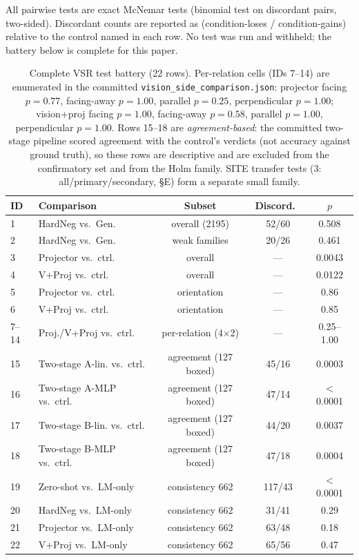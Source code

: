 All pairwise tests are exact McNemar tests (binomial test on discordant pairs,
two-sided). Discordant counts are reported as (condition-loses /
condition-gains) relative to the control named in each row. No test was run and
withheld; the battery below is complete for this paper.

\begin{table}[h]
\centering
\footnotesize
\setlength{\tabcolsep}{6pt}
\begin{tabular}{llccc}
\toprule
ID & Comparison & Subset & Discord.\ & $p$ \\
\midrule
1 & HardNeg vs.\ Gen. & overall (2195) & 52/60 & 0.508 \\
2 & HardNeg vs.\ Gen. & weak families & 20/26 & 0.461 \\
3 & Projector vs.\ ctrl. & overall & --- & 0.0043 \\
4 & V+Proj vs.\ ctrl. & overall & --- & 0.0122 \\
5 & Projector vs.\ ctrl. & orientation & --- & 0.86 \\
6 & V+Proj vs.\ ctrl. & orientation & --- & 0.85 \\
7--14 & Proj./V+Proj vs.\ ctrl. & per-relation (4$\times$2) & --- & 0.25--1.00 \\
15 & Two-stage A-lin. vs.\ ctrl. & agreement (127 boxed) & 45/16 & 0.0003 \\
16 & Two-stage A-MLP vs.\ ctrl. & agreement (127 boxed) & 47/14 & $<$0.0001 \\
17 & Two-stage B-lin. vs.\ ctrl. & agreement (127 boxed) & 44/20 & 0.0037 \\
18 & Two-stage B-MLP vs.\ ctrl. & agreement (127 boxed) & 47/18 & 0.0004 \\
19 & Zero-shot vs.\ LM-only & consistency 662 & 117/43 & $<$0.0001 \\
20 & HardNeg vs.\ LM-only & consistency 662 & 31/41 & 0.29 \\
21 & Projector vs.\ LM-only & consistency 662 & 63/48 & 0.18 \\
22 & V+Proj vs.\ LM-only & consistency 662 & 65/56 & 0.47 \\
\bottomrule
\end{tabular}
\caption{Complete VSR test battery (22 rows). Per-relation cells (IDs 7--14)
are enumerated in the committed \texttt{vision\_side\_\allowbreak{}comparison.\allowbreak{}json}:
projector facing $p{=}0.77$, facing-away $p{=}1.00$, parallel $p{=}0.25$,
perpendicular $p{=}1.00$; vision+proj facing $p{=}1.00$, facing-away
$p{=}0.58$, parallel $p{=}1.00$, perpendicular $p{=}1.00$. Rows 15--18 are
\emph{agreement-based}: the committed two-stage pipeline scored agreement
with the control's verdicts (not accuracy against ground truth), so these
rows are descriptive and are excluded from the confirmatory set and from the
Holm family. SITE transfer tests (3: all/primary/secondary, \S E) form a
separate small family.}
\label{tab:tests}
\end{table}

